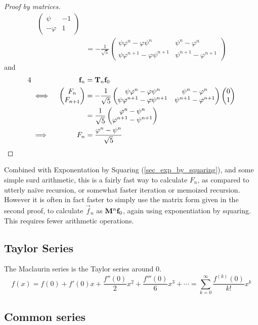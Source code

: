 \begin{proof}[Proof by matrices]
\begin{align*}
        \begin{pmatrix}
            \psi & -1 \\
            -\varphi & 1
        \end{pmatrix} \\
        &=
        -\frac 1 {\sqrt 5}
        \begin{pmatrix}
            \psi \varphi^n -\varphi \psi^n & \psi^n - \varphi^n \\
            \psi \varphi^{n + 1} - \varphi \psi^{n + 1} &
                \psi^{n + 1} - \varphi^{n + 1}
        \end{pmatrix}
    \end{align*}
    and
    \begin{alignat*}4
        &&\vec f_n &= \mat T_n \vec f_0 \\
        &\iff{}&
        \begin{pmatrix}
            F_n \\
            F_{n + 1}
        \end{pmatrix} &=
        -\frac 1 {\sqrt 5}
        \begin{pmatrix}
            \psi \varphi^n -\varphi \psi^n & \psi^n - \varphi^n \\
            \psi \varphi^{n + 1} - \varphi \psi^{n + 1} &
                \psi^{n + 1} - \varphi^{n + 1}
        \end{pmatrix}
        \begin{pmatrix}
            0 \\
            1
        \end{pmatrix} \\
        && &=
        \frac 1 {\sqrt 5}
        \begin{pmatrix}
            \varphi^n - \psi^n \\
            \varphi^{n + 1} - \psi^{n + 1}
        \end{pmatrix} \\
        &\implies{}& F_n &= \frac{\varphi^n - \psi^n}{\sqrt 5} \qedhere
    \end{alignat*}
\end{proof}
Combined with Exponentation by Squaring (\ref{sec_exp_by_squaring}), and some
simple surd arithmetic, this is a fairly fast way to calculate \(F_n\), as
compared to utterly na\"ive recursion, or somewhat faster iteration or memoized
recursion. However it is often in fact faster to simply use the matrix form
given in the second proof, to calculate \(\vec f_n\) as \(\mathbf{M}^n\mathrm{\mathbf{f}}_0\),
again using exponentiation by squaring. This requires fewer arithmetic
operations.

\subsection{Taylor Series}

The Maclaurin series is the Taylor series around \(0\).
\begin{equation}
f(x) = f(0) + f'(0) x + \frac{f''(0)} 2 x^2 + \frac{f'''(0)}6 x^3 +\dotsb
  = \sum_{k=0}^\infty \frac{f^{(k)}(0)}{k!}x^k
\end{equation}

\subsection{Common series}
